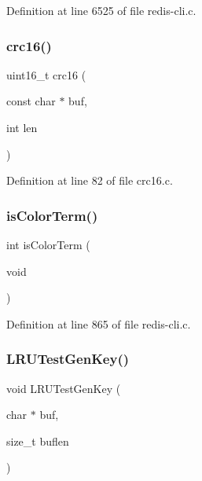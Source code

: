 Definition at line 6525 of file redis-\/cli.\+c.

\mbox{\label{redis-cli_8c_a1af61bf3da70181a7591b0f5758913a3}} 
\subsubsection{\texorpdfstring{crc16()}{crc16()}}
{\footnotesize\ttfamily uint16\+\_\+t crc16 (\begin{DoxyParamCaption}\item[{const char $\ast$}]{buf,  }\item[{int}]{len }\end{DoxyParamCaption})}



Definition at line 82 of file crc16.\+c.

\mbox{\label{redis-cli_8c_a714e96cca59b2378fae3f82a093d6d55}} 
\subsubsection{\texorpdfstring{is\+Color\+Term()}{isColorTerm()}}
{\footnotesize\ttfamily int is\+Color\+Term (\begin{DoxyParamCaption}\item[{void}]{ }\end{DoxyParamCaption})}



Definition at line 865 of file redis-\/cli.\+c.

\mbox{\label{redis-cli_8c_a0310958a96dc28c6abcebccc4a75a936}} 
\subsubsection{\texorpdfstring{L\+R\+U\+Test\+Gen\+Key()}{LRUTestGenKey()}}
{\footnotesize\ttfamily void L\+R\+U\+Test\+Gen\+Key (\begin{DoxyParamCaption}\item[{char $\ast$}]{buf,  }\item[{size\+\_\+t}]{buflen }\end{DoxyParamCaption})}



